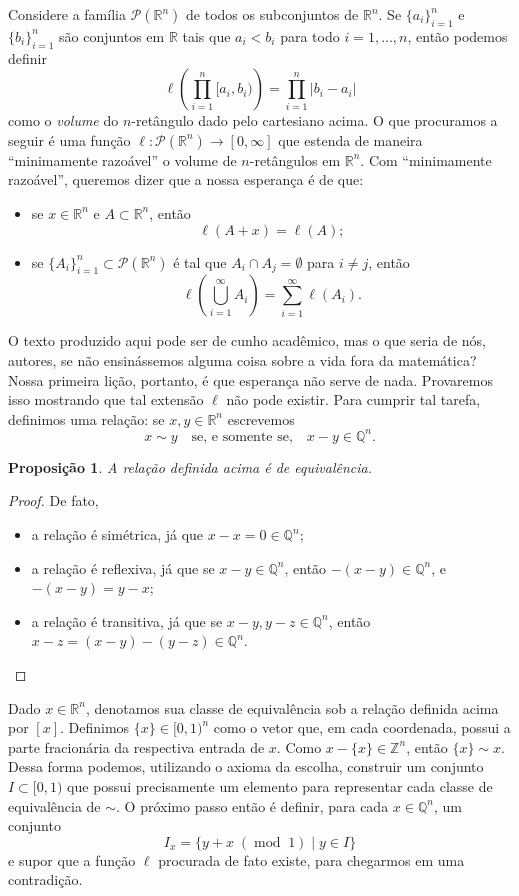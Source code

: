 \documentclass{article}
\newtheorem{proposition}[definition]{Proposição}
\DeclareMathOperator{\ArithmeticMod}{mod}
\newcommand{\modulus}[1]{\phantom{.}(\ArithmeticMod\phantom{.}#1)}
\begin{document}
Considere a família $\mathcal{P}(\mathbb{R}^n)$ de todos os subconjuntos de $\mathbb{R}^n$. Se $\{a_i\}_{i = 1}^n$ e $\{b_i\}_{i = 1}^n$ são conjuntos em $\mathbb{R}$ tais que $a_i < b_i$ para todo $i = 1, \dots, n$, então podemos definir $$\ell\left(\prod_{i = 1}^n [a_i, b_i)\right) = \prod_{i = 1}^n |b_i - a_i|$$ como o \textit{volume} do $n$-retângulo dado pelo cartesiano acima. O que procuramos a seguir é uma função $\ell \colon \mathcal{P}(\mathbb{R}^n) \to [0, \infty]$ que estenda de maneira ``minimamente razoável'' o volume de $n$-retângulos em $\mathbb{R}^n$. Com ``minimamente razoável'', queremos dizer que a nossa esperança é de que: \begin{itemize}
    \item se $x \in \mathbb{R}^n$ e $A \subset \mathbb{R}^n$, então $$\ell(A + x) = \ell(A);$$
    \item se $\{A_i\}_{i = 1}^n \subset \mathcal{P}(\mathbb{R}^n)$ é tal que $A_i \cap A_j = \emptyset$ para $i \neq j$, então $$\ell\left(\bigcup_{i = 1}^\infty A_i\right) = \sum_{i = 1}^\infty \ell(A_i).$$ 
\end{itemize}
O texto produzido aqui pode ser de cunho acadêmico, mas o que seria de nós, autores, se não ensinássemos alguma coisa sobre a vida fora da matemática? Nossa primeira lição, portanto, é que esperança não serve de nada. Provaremos isso mostrando que tal extensão $\ell$ não pode existir. Para cumprir tal tarefa, definimos uma relação: se $x, y \in \mathbb{R}^n$ escrevemos $$x \sim y \quad \text{se, e somente se,} \quad x - y \in \mathbb{Q}^n.$$

\begin{proposition}
    A relação definida acima é de equivalência.
\end{proposition}
\begin{proof}
    De fato, \begin{itemize}
        \item a relação é simétrica, já que $x - x = 0 \in \mathbb{Q}^n$;
        \item a relação é reflexiva, já que se $x - y \in \mathbb{Q}^n$, então $- (x - y) \in \mathbb{Q}^n$, e $-(x-y) = y-x$;
        \item a relação é transitiva, já que se $x - y, y - z \in \mathbb{Q}^n$, então $x - z = (x - y) - (y - z) \in \mathbb{Q}^n$.
    \end{itemize}
\end{proof}

Dado $x \in \mathbb{R}^n$, denotamos sua classe de equivalência sob a relação definida acima por $[x]$. Definimos $\{x\} \in [0,1)^n$ como o vetor que, em cada coordenada, possui a parte fracionária da respectiva entrada de $x$. Como $x - \{x\} \in \mathbb{Z}^n$, então $\{x\} \sim x$. Dessa forma podemos, utilizando o axioma da escolha, construir um conjunto $I \subset [0,1)$ que possui precisamente um elemento para representar cada classe de equivalência de $\sim$. O próximo passo então é definir, para cada $x \in \mathbb{Q}^n$, um conjunto $$I_x = \{y + x \modulus{1} \mid y \in I\}$$ e supor que a função $\ell$ procurada de fato existe, para chegarmos em uma contradição.
\end{document}
